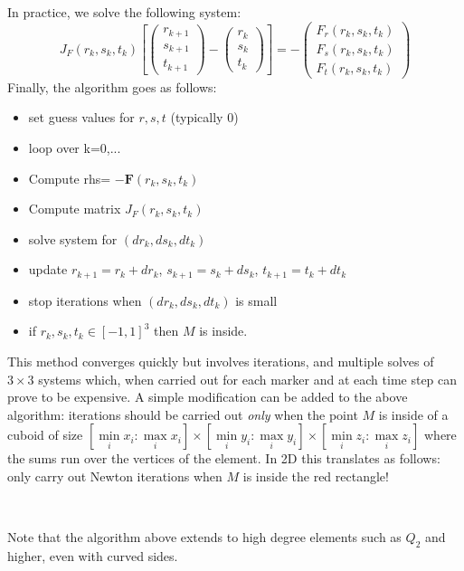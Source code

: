 In practice, we solve the following system:
\[
J_F(r_k,s_k,t_k) 
\left[  
\left(
\begin{array}{c}
r_{k+1} \\s_{k+1} \\ t_{k+1}
\end{array}
\right)
-
\left(
\begin{array}{c}
r_{k} \\s_{k} \\ t_{k}
\end{array}
\right)
\right]=-
\left(
\begin{array}{c}
F_r(r_k,s_k,t_k) \\
F_s(r_k,s_k,t_k)\\
F_t(r_k,s_k,t_k)
\end{array}
\right)
\]
Finally, the algorithm goes as follows:
\begin{itemize}
\item set guess values for $r,s,t$ (typically 0)
\item loop over k=0,...
\item Compute rhs= $-{\bm F}(r_k,s_k,t_k)$ 
\item Compute matrix $J_F(r_k,s_k,t_k)$
\item solve system for $(dr_k,ds_k,dt_k)$
\item update $r_{k+1}=r_k+dr_k$, $s_{k+1}=s_k+ds_k$, $t_{k+1}=t_k+dt_k$ 
\item stop iterations when $(dr_k,ds_k,dt_k)$ is small
\item if $r_k,s_k,t_k\in[-1,1]^3$ then $M$ is inside.
\end{itemize}
This method converges quickly but involves iterations, and multiple solves of $3\times 3$ systems which, 
when carried out for each marker and at each time step can prove to be expensive. 
A simple modification can be added to the above algorithm: iterations should be carried out {\it only}
when the point $M$ is inside of a cuboid of size $[\min\limits_i{x_i}:\max\limits_i{x_i}]\times[\min\limits_i{y_i}:\max\limits_i{y_i} ]
\times[\min\limits_i{z_i}:\max\limits_i{z_i}]$ where the sums run over the vertices of the element. 
In 2D this translates as follows: only carry out Newton iterations when $M$ is inside the red rectangle!
\begin{center}
\\
\end{center}

Note that the algorithm above extends to high degree elements such as $Q_2$ and higher, even with curved sides.




